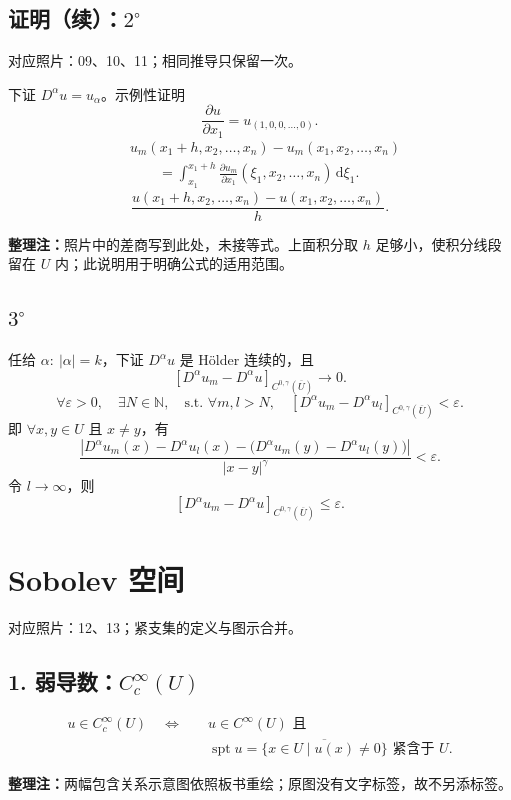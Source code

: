 \documentclass[UTF8,a4paper,11pt,fontset=fandol]{ctexart}
\newcommand{\N}{\mathbb N}
\newcommand{\dd}{\,\mathrm d}
\newcommand{\Ub}{\overline U}
\newcommand{\hn}[1]{\left[#1\right]_{C^{0,\gamma}(\Ub)}}
\newcommand{\ednote}[1]{\par{\small\color{notegray}\textbf{整理注：}#1}\par}
\newcommand{\source}[1]{{\small\color{notegray}对应照片：#1。}\par}
\begin{document}
\newpage
\subsection*{证明（续）：$2^\circ$}
\source{09、10、11；相同推导只保留一次}
下证 $D^\alpha u=u_\alpha$。示例性证明
\[
\frac{\partial u}{\partial x_1}=u_{(1,0,0,\ldots,0)}.
\]
\[
\begin{aligned}
&u_m(x_1+h,x_2,\ldots,x_n)-u_m(x_1,x_2,\ldots,x_n)\\
&\qquad=\int_{x_1}^{x_1+h}
\frac{\partial u_m}{\partial x_1}(\xi_1,x_2,\ldots,x_n)\dd\xi_1.
\end{aligned}
\]
\[
\frac{u(x_1+h,x_2,\ldots,x_n)-u(x_1,x_2,\ldots,x_n)}{h}.
\]
\ednote{照片中的差商写到此处，未接等式。上面积分取 $h$ 足够小，使积分线段留在 $U$ 内；此说明用于明确公式的适用范围。}

\subsection*{$3^\circ$}
任给 $\alpha:\ |\alpha|=k$，下证 $D^\alpha u$ 是 Hölder 连续的，且
\[
\hn{D^\alpha u_m-D^\alpha u}\longrightarrow0.
\]
\[
\forall\varepsilon>0,\quad\exists N\in\N,\quad
\text{s.t. }\forall m,l>N,\quad
\hn{D^\alpha u_m-D^\alpha u_l}<\varepsilon.
\]
即 $\forall x,y\in U$ 且 $x\ne y$，有
\[
\frac{\left|D^\alpha u_m(x)-D^\alpha u_l(x)
-\bigl(D^\alpha u_m(y)-D^\alpha u_l(y)\bigr)\right|}
{|x-y|^\gamma}<\varepsilon.
\]
令 $l\to\infty$，则
\[
\hn{D^\alpha u_m-D^\alpha u}\leq\varepsilon.
\]

\newpage
\section*{Sobolev 空间}
\source{12、13；紧支集的定义与图示合并}
\subsection*{1. 弱导数：$C_c^\infty(U)$}
\[
\begin{aligned}
u\in C_c^\infty(U)\quad\Longleftrightarrow\quad
&u\in C^\infty(U)\text{ 且}\\
&\operatorname{spt}u
=\overline{\{x\in U\mid u(x)\ne0\}}
\text{ 紧含于 }U.
\end{aligned}
\]
\begin{center}
\end{center}
\ednote{两幅包含关系示意图依照板书重绘；原图没有文字标签，故不另添标签。}
\end{document}
